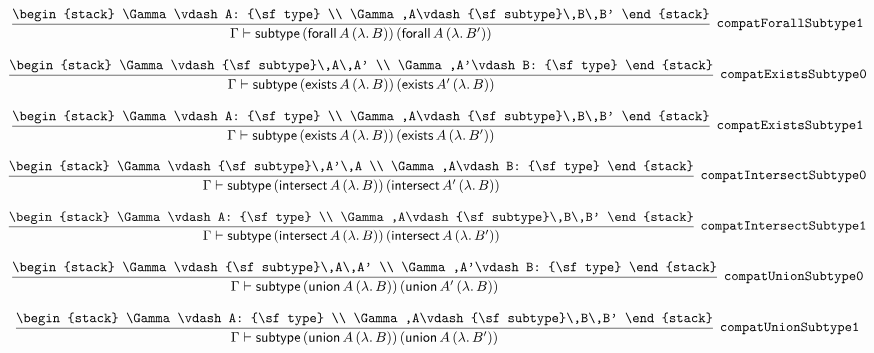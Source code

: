 \[
\infer[{\tt compatForallSubtype1}]{\Gamma \vdash {\sf subtype}\,({\sf forall}\,A\,(\lambda .\,B))\,({\sf forall}\,A\,(\lambda .\,B'))}{
\begin{stack}
\Gamma \vdash A: {\sf type}
\\
\Gamma ,A\vdash {\sf subtype}\,B\,B'
\end{stack}}
\]

\[
\infer[{\tt compatExistsSubtype0}]{\Gamma \vdash {\sf subtype}\,({\sf exists}\,A\,(\lambda .\,B))\,({\sf exists}\,A'\,(\lambda .\,B))}{
\begin{stack}
\Gamma \vdash {\sf subtype}\,A\,A'
\\
\Gamma ,A'\vdash B: {\sf type}
\end{stack}}
\]

\[
\infer[{\tt compatExistsSubtype1}]{\Gamma \vdash {\sf subtype}\,({\sf exists}\,A\,(\lambda .\,B))\,({\sf exists}\,A\,(\lambda .\,B'))}{
\begin{stack}
\Gamma \vdash A: {\sf type}
\\
\Gamma ,A\vdash {\sf subtype}\,B\,B'
\end{stack}}
\]

\[
\infer[{\tt compatIntersectSubtype0}]{\Gamma \vdash {\sf subtype}\,({\sf intersect}\,A\,(\lambda .\,B))\,({\sf intersect}\,A'\,(\lambda .\,B))}{
\begin{stack}
\Gamma \vdash {\sf subtype}\,A'\,A
\\
\Gamma ,A\vdash B: {\sf type}
\end{stack}}
\]

\[
\infer[{\tt compatIntersectSubtype1}]{\Gamma \vdash {\sf subtype}\,({\sf intersect}\,A\,(\lambda .\,B))\,({\sf intersect}\,A\,(\lambda .\,B'))}{
\begin{stack}
\Gamma \vdash A: {\sf type}
\\
\Gamma ,A\vdash {\sf subtype}\,B\,B'
\end{stack}}
\]

\[
\infer[{\tt compatUnionSubtype0}]{\Gamma \vdash {\sf subtype}\,({\sf union}\,A\,(\lambda .\,B))\,({\sf union}\,A'\,(\lambda .\,B))}{
\begin{stack}
\Gamma \vdash {\sf subtype}\,A\,A'
\\
\Gamma ,A'\vdash B: {\sf type}
\end{stack}}
\]

\[
\infer[{\tt compatUnionSubtype1}]{\Gamma \vdash {\sf subtype}\,({\sf union}\,A\,(\lambda .\,B))\,({\sf union}\,A\,(\lambda .\,B'))}{
\begin{stack}
\Gamma \vdash A: {\sf type}
\\
\Gamma ,A\vdash {\sf subtype}\,B\,B'
\end{stack}}
\]

